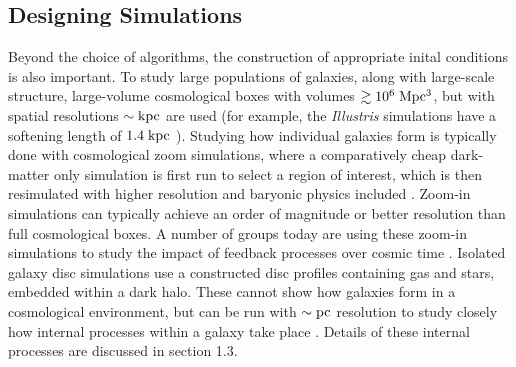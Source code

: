 \subsection{Designing Simulations}
Beyond the choice of algorithms, the construction of appropriate inital
conditions is also important.  To study large populations of galaxies, along
with large-scale structure, large-volume cosmological boxes with volumes
$\gtrsim 10^6\;\rm{Mpc^3}$, but with spatial resolutions $\sim \rm{kpc}$ are
used (for example, the {\it Illustris} simulations have a softening length of
$1.4\;\rm{kpc}$ \citealt{Vogelsberger2014b}).  Studying how individual galaxies
form is typically done with cosmological zoom simulations, where a comparatively
cheap dark-matter only simulation is first run to select a region of interest,
which is then resimulated with higher resolution and baryonic physics included
\citep{Navarro1993}. Zoom-in simulations can typically achieve an order of
magnitude or better resolution than full cosmological boxes.  A number of groups
today are using these zoom-in simulations to study the impact of feedback
processes over cosmic time \citep{Stinson2013,Hopkins2014,Agertz2015}.  Isolated
galaxy disc simulations use a constructed disc profiles containing gas and
stars, embedded within a dark halo. These cannot show how galaxies form in a
cosmological environment, but can be run with $\sim \rm{pc}$ resolution to study
closely how internal processes within a galaxy take place
\citep{Hopkins2011,Benincasa2016}.  Details of these internal processes are
discussed in section 1.3.

